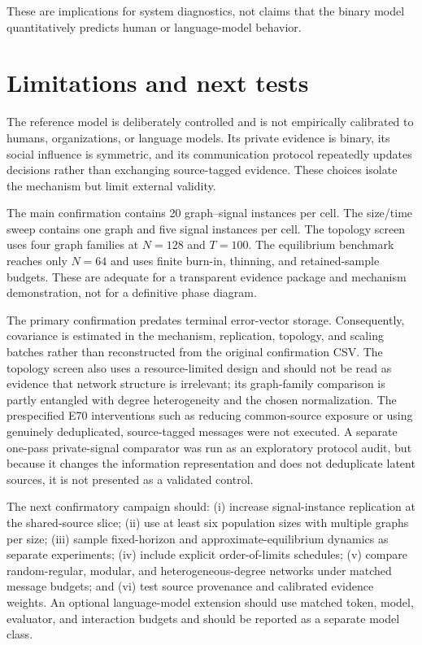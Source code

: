 \documentclass[11pt,a4paper]{article}
\begin{document}
These are implications for system diagnostics, not claims that the binary model quantitatively predicts human or language-model behavior.

\section{Limitations and next tests}

The reference model is deliberately controlled and is not empirically calibrated to humans, organizations, or language models. Its private evidence is binary, its social influence is symmetric, and its communication protocol repeatedly updates decisions rather than exchanging source-tagged evidence. These choices isolate the mechanism but limit external validity.

The main confirmation contains 20 graph--signal instances per cell. The size/time sweep contains one graph and five signal instances per cell. The topology screen uses four graph families at $N=128$ and $T=100$. The equilibrium benchmark reaches only $N=64$ and uses finite burn-in, thinning, and retained-sample budgets. These are adequate for a transparent evidence package and mechanism demonstration, not for a definitive phase diagram.

The primary confirmation predates terminal error-vector storage. Consequently, covariance is estimated in the mechanism, replication, topology, and scaling batches rather than reconstructed from the original confirmation CSV. The topology screen also uses a resource-limited design and should not be read as evidence that network structure is irrelevant; its graph-family comparison is partly entangled with degree heterogeneity and the chosen normalization. The prespecified E70 interventions such as reducing common-source exposure or using genuinely deduplicated, source-tagged messages were not executed. A separate one-pass private-signal comparator was run as an exploratory protocol audit, but because it changes the information representation and does not deduplicate latent sources, it is not presented as a validated control.

The next confirmatory campaign should: (i) increase signal-instance replication at the shared-source slice; (ii) use at least six population sizes with multiple graphs per size; (iii) sample fixed-horizon and approximate-equilibrium dynamics as separate experiments; (iv) include explicit order-of-limits schedules; (v) compare random-regular, modular, and heterogeneous-degree networks under matched message budgets; and (vi) test source provenance and calibrated evidence weights. An optional language-model extension should use matched token, model, evaluator, and interaction budgets and should be reported as a separate model class.
\end{document}
